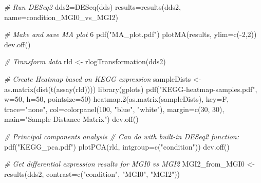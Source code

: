 \documentclass[
]{book}
\newenvironment{Shaded}{\begin{snugshade}}{\end{snugshade}}
\newcommand{\AttributeTok}[1]{\textcolor[rgb]{0.77,0.63,0.00}{#1}}
\newcommand{\CommentTok}[1]{\textcolor[rgb]{0.56,0.35,0.01}{\textit{#1}}}
\newcommand{\DecValTok}[1]{\textcolor[rgb]{0.00,0.00,0.81}{#1}}
\newcommand{\FunctionTok}[1]{\textcolor[rgb]{0.00,0.00,0.00}{#1}}
\newcommand{\NormalTok}[1]{#1}
\newcommand{\OtherTok}[1]{\textcolor[rgb]{0.56,0.35,0.01}{#1}}
\newcommand{\SpecialCharTok}[1]{\textcolor[rgb]{0.00,0.00,0.00}{#1}}
\newcommand{\StringTok}[1]{\textcolor[rgb]{0.31,0.60,0.02}{#1}}
\begin{document}
\begin{Shaded}
\begin{Highlighting}[]
\CommentTok{\# Run DESeq2}
\NormalTok{dds2}\OtherTok{=}\FunctionTok{DESeq}\NormalTok{(dds)}
\NormalTok{results}\OtherTok{=}\FunctionTok{results}\NormalTok{(dds2, }\AttributeTok{name=}\StringTok{\textquotesingle{}condition\_MGI0\_vs\_MGI2\textquotesingle{}}\NormalTok{)}

\CommentTok{\# Make and save MA plot}
\DecValTok{6}
\FunctionTok{pdf}\NormalTok{(}\StringTok{"MA\_plot.pdf"}\NormalTok{)}
\FunctionTok{plotMA}\NormalTok{(results, }\AttributeTok{ylim=}\FunctionTok{c}\NormalTok{(}\SpecialCharTok{{-}}\DecValTok{2}\NormalTok{,}\DecValTok{2}\NormalTok{))}
\FunctionTok{dev.off}\NormalTok{()}

\CommentTok{\# Transform data}
\NormalTok{rld }\OtherTok{\textless{}{-}} \FunctionTok{rlogTransformation}\NormalTok{(dds2)}

\CommentTok{\# Create Heatmap based on KEGG expression}
\NormalTok{sampleDists }\OtherTok{\textless{}{-}} \FunctionTok{as.matrix}\NormalTok{(}\FunctionTok{dist}\NormalTok{(}\FunctionTok{t}\NormalTok{(}\FunctionTok{assay}\NormalTok{(rld))))}
\FunctionTok{library}\NormalTok{(gplots)}
\FunctionTok{pdf}\NormalTok{(}\StringTok{"KEGG{-}heatmap{-}samples.pdf"}\NormalTok{, }\AttributeTok{w=}\DecValTok{50}\NormalTok{, }\AttributeTok{h=}\DecValTok{50}\NormalTok{, }\AttributeTok{pointsize=}\DecValTok{50}\NormalTok{)}
\FunctionTok{heatmap.2}\NormalTok{(}\FunctionTok{as.matrix}\NormalTok{(sampleDists), }\AttributeTok{key=}\NormalTok{F, }\AttributeTok{trace=}\StringTok{"none"}\NormalTok{,}
\AttributeTok{col=}\FunctionTok{colorpanel}\NormalTok{(}\DecValTok{100}\NormalTok{, }\StringTok{"blue"}\NormalTok{, }\StringTok{"white"}\NormalTok{),}
\AttributeTok{margin=}\FunctionTok{c}\NormalTok{(}\DecValTok{30}\NormalTok{, }\DecValTok{30}\NormalTok{), }\AttributeTok{main=}\StringTok{"Sample Distance Matrix"}\NormalTok{)}
\FunctionTok{dev.off}\NormalTok{()}

\CommentTok{\# Principal components analysis}
\CommentTok{\# Can do with built{-}in DESeq2 function:}
\FunctionTok{pdf}\NormalTok{(}\StringTok{"KEGG\_pca.pdf"}\NormalTok{)}
\FunctionTok{plotPCA}\NormalTok{(rld, }\AttributeTok{intgroup=}\FunctionTok{c}\NormalTok{(}\StringTok{"condition"}\NormalTok{))}
\FunctionTok{dev.off}\NormalTok{()}

\CommentTok{\# Get differential expression results for MGI0 vs MGI2}
\NormalTok{MGI2\_from\_MGI0 }\OtherTok{\textless{}{-}} \FunctionTok{results}\NormalTok{(dds2, }\AttributeTok{contrast=}\FunctionTok{c}\NormalTok{(}\StringTok{"condition"}\NormalTok{, }\StringTok{"MGI0"}\NormalTok{, }\StringTok{"MGI2"}\NormalTok{))}


\end{Highlighting}
\end{Shaded}
\end{document}
